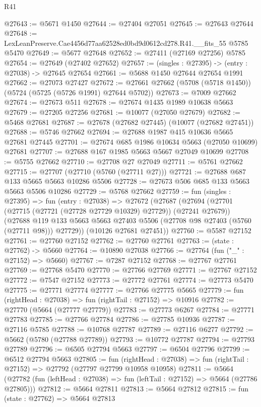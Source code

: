 \begin{lexlean}{R41}
\begin{coremodule}
@27643 := @5671 @1450
@27644 := @27404 @27051
@27645 := @27643 @27644
@27648 := LexLeanPreserve.Cae4456d77aa62528ed0bd9d0612cd278.R41.__fits_55 @5785 @5470
@27649 := @5677 @27648
@27652 := @27411 (@27169 @27256) @5785
@27654 := @27649 (@27402 @27652)
@27657 := (singles : @27395) -> (entry : @27038) -> @27645 @27654
@27661 := @5688 @1450 @27644 @27654 @1991
@27662 := @27073 @27427
@27672 := @27661 @27662 (@5708 (@5718 @1450)) (@5724 (@5725 (@5726 @1991) @27644 @5702))
@27673 := @7009 @27662
@27674 := @27673 @511
@27678 := @27674 @1435 @1989 @10638 @5663
@27679 := @27205 @27256
@27681 := @10077 (@27050 @27679)
@27682 := @5468 @27681
@27687 := @27678 (@27682 @27445) (@10077 (@27682 @27451))
@27688 := @5746 @27662
@27694 := @27688 @1987 @415 @10636 @5665 @27681 @27445
@27701 := @27674 @685 @1986 @10634 @5663 (@27050 @10699) @27681
@27707 := @27688 @167 @1985 @5663 @5667 @27049 @10699
@27708 := @5755 @27662
@27710 := @27708 @27 @27049
@27711 := @5761 @27662
@27715 := @27707 (@27710 (@5760 (@27711 @27)))
@27721 := @27688 @687 @133 @5665 @5663 @10286 @5506
@27728 := @27673 @506 @685 @133 @5663 @5663 @5506 @10286
@27729 := @5768 @27662
@27759 := fun (singles : @27395) =>
  fun (entry : @27038) =>
  @27672
    (@27687
      (@27694
        (@27701 (@27715 (@27721 (@27728 @27729 @10329) @27729)) (@27241 @27679))
        (@27688 @119 @133 @5663 @5663 @27403 @5506 (@27708 @98 @27403 (@5760 (@27711 @98))) @27729))
      (@10126 @27681 @27451))
@27760 := @5587 @27152
@27761 := @27760 @27152
@27762 := @27760 @27761
@27763 := (state : @27762) -> @5660
@27764 := @10890 @27038
@27766 := @27764 (fun ("_" : @27152) => @5660)
@27767 := @7287 @27152
@27768 := @27767 @27761
@27769 := @27768 @5470
@27770 := @27766 @27769
@27771 := @27767 @27152
@27772 := @7547 @27152
@27773 := @27772 @27761
@27774 := @27773 @5470
@27775 := @27771 @27774
@27777 := @27766 @27775 @5665
@27779 := fun (rightHead : @27038) => fun (rightTail : @27152) => @10916
@27782 := @27770 (@5664 (@27777 @27779))
@27783 := @27773 @6267
@27784 := @27771 @27783
@27785 := @27766 @27784
@27786 := @27785 @10936
@27787 := @27116 @5785
@27788 := @10768 @27787
@27789 := @27116 @6277
@27792 := @5662 (@5780 (@27788 @27789))
@27793 := @10772 @27787
@27794 := @27793 @27789
@27796 := @6505 @27794 @5663
@27797 := @6504 @27796
@27799 := @6512 @27794 @5663
@27805 := fun (rightHead : @27038) =>
  fun (rightTail : @27152) => @27792 (@27797 @27799 @10958 @10958)
@27811 := @5664
    (@27782 (fun (leftHead : @27038) => fun (leftTail : @27152) => @5664 (@27786 @27805)))
@27812 := @5664 @27811
@27813 := @5664 @27812
@27815 := fun (state : @27762) => @5664 @27813

\end{coremodule}
\end{lexlean}
